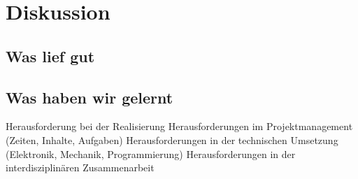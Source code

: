 \chapter{Diskussion}

\section{Was lief gut}

\section{Was haben wir gelernt}
Herausforderung bei der Realisierung
    Herausforderungen im Projektmanagement (Zeiten, Inhalte, Aufgaben)
    Herausforderungen in der technischen Umsetzung (Elektronik, Mechanik, Programmierung)
    Herausforderungen in der interdisziplinären Zusammenarbeit

